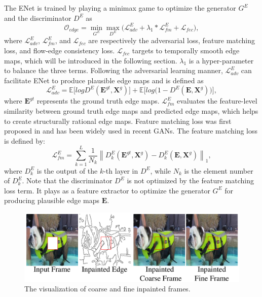 The ENet is trained by playing a minimax game to optimize the generator $G^E$ and the discriminator $D^E$ as
\begin{equation}
\label{eq:loss_e}
\mathcal{O}_{edge} =\min\limits_{G^E} \max \limits_{D^E} \big(\mathcal{L}^E_{adv}+\lambda_1 * \mathcal{L}^E_{fm}+\mathcal{L}_{fec}\big),
\end{equation}
where $\mathcal{L}^E_{adv}$, $\mathcal{L}^E_{fm}$, and $\mathcal{L}_{fec}$ are respectively the adversarial loss, feature matching loss, and flow-edge consistency loss. $\mathcal{L}_{fec}$ targets to temporally smooth edge maps, which will be introduced in the following section.
$\lambda_1$ is a hyper-parameter to balance the three terms.
%
Following the adversarial learning manner, $\mathcal{L}^E_{adv}$ can facilitate ENet to produce plausible edge maps and is defined as
\begin{equation} \label{eq:edge_adver}
\mathcal{L}^E_{adv}  =\mathbb{E}\big[logD^E(\boldsymbol{E}^{gt},\boldsymbol{X}^{g})\big] +\mathbb{E} \big[log\big(1-D^E ( \boldsymbol{E},\boldsymbol{X}^{g})\big)\big],
\end{equation}
where $\boldsymbol{E}^{gt}$ represents the ground truth edge maps. $\mathcal{L}^E_{fm}$ evaluates the feature-level similarity between ground truth edge maps and predicted edge maps, which helps to create structurally rational edge maps. 
Feature matching loss was first proposed in \cite{wang2018high} and has been widely used in recent GANs.
The feature matching loss is defined by:
\begin{equation}
\label{eq:edge_fm}
\mathcal{L}^E_{fm}=\sum_{k=1}^L{\frac{1}{N_k}\left\| D^E_k(\boldsymbol{E}^{gt},\boldsymbol{X}^{g})- D^E_k(\boldsymbol{E},\boldsymbol{X}^{g})\right\|_1},
\end{equation}
where $D^E_k$ is the output of the $k$-th layer in $D^E$, while $N_k$ is the element number of $D^E_k$. 
Note that the discriminator $D^E$ is not optimized by the feature matching loss term. It plays as a feature extractor to optimize the generator $G^E$ for producing plausible edge maps $\boldsymbol{E}$.


\begin{figure}[t]
	\centering
	\includegraphics[width=1.0\columnwidth]{coars-fine} %
	\caption{The visualization of coarse and fine inpainted frames.}
	
	\label{fig:coarse-fine}
\end{figure}



